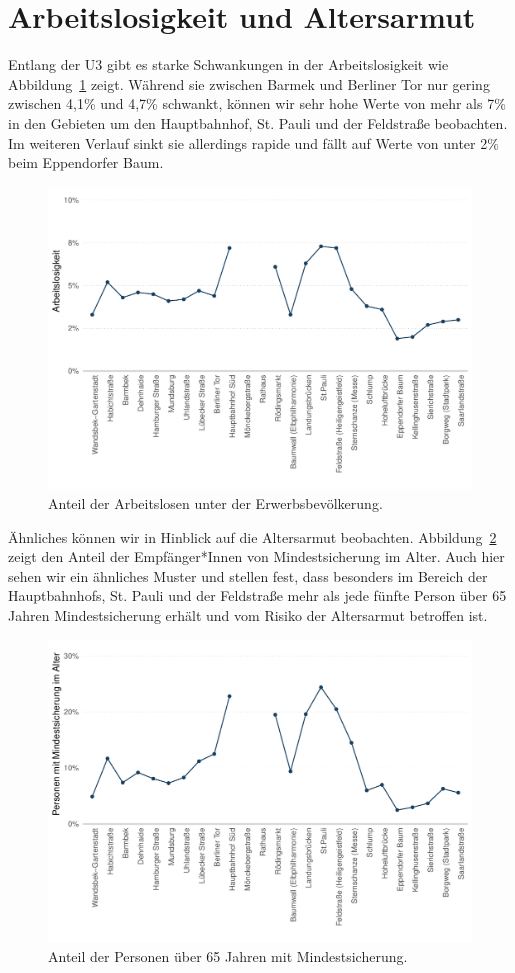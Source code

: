\documentclass[10pt,a4paper]{article}
\begin{document}
\section*{Arbeitslosigkeit und Altersarmut}
Entlang der U3 gibt es starke Schwankungen in der Arbeitslosigkeit wie Abbildung~\ref{fig:unemployment} zeigt. Während sie zwischen Barmek und Berliner Tor nur gering zwischen 4,1\% und 4,7\% schwankt, können wir sehr hohe Werte von mehr als 7\% in den Gebieten um den Hauptbahnhof, St. Pauli und der Feldstraße beobachten. Im weiteren Verlauf sinkt sie allerdings rapide und fällt auf Werte von unter 2\% beim Eppendorfer Baum.

\begin{figure}[h!]
	\centering
	\caption{Anteil der Arbeitslosen unter der Erwerbsbevölkerung.}
	\label{fig:unemployment}
	\includegraphics[width=0.8\linewidth]{../../02_results/fig_unemployment.pdf}
\end{figure}

Ähnliches können wir in Hinblick auf die Altersarmut beobachten. Abbildung~\ref{fig:mindestsicherung_alter} zeigt den Anteil der Empfänger*Innen von Mindestsicherung im Alter. Auch hier sehen wir ein ähnliches Muster und stellen fest, dass besonders im Bereich der Hauptbahnhofs, St. Pauli und der Feldstraße mehr als jede fünfte Person über 65 Jahren Mindestsicherung erhält und vom Risiko der Altersarmut betroffen ist.

\begin{figure}[h!]
	\centering
	\caption{Anteil der Personen über 65 Jahren mit Mindestsicherung.}
	\label{fig:mindestsicherung_alter}
	\includegraphics[width=0.8\linewidth]{../../02_results/fig_mindestsicherung_alter.pdf}
\end{figure}
\end{document}
